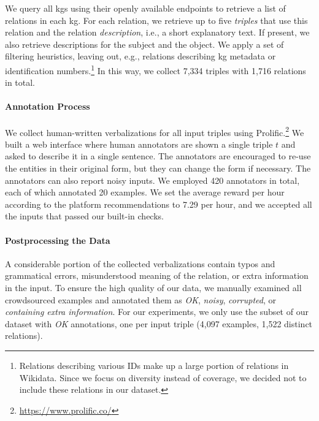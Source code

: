 We query all \acp{kg} using their openly available endpoints to retrieve a list of relations in each \ac{kg}. For each relation, we retrieve up to five \textit{triples} that use this relation and the relation \textit{description}, i.e., a short explanatory text.
If present, we also retrieve descriptions for the subject and the object. We apply a set of filtering heuristics, leaving out, e.g., relations describing \ac{kg} metadata or identification numbers.\footnote{Relations describing various IDs make up a large portion of relations in Wikidata. Since we focus on diversity instead of coverage, we decided not to include these relations in our dataset.} In this way, we collect 7,334 triples with 1,716 relations in total.

\paragraph{Annotation Process}
We collect human-written verbalizations for all input triples using Prolific.\footnote{\url{https://www.prolific.co/}} We built a web interface where human annotators are shown a single triple $t$ and asked to describe it in a single sentence. The annotators are encouraged to re-use the entities in their original form, but they can change the form if necessary. The annotators can also report noisy inputs. We employed 420 annotators in total, each of which annotated 20 examples. We set the average reward per hour according to the platform recommendations to  \textsterling{}7.29 per hour, and we accepted all the inputs that passed our built-in checks.

\paragraph{Postprocessing the Data}
A considerable portion of the collected verbalizations contain typos and grammatical errors, misunderstood meaning of the relation, or extra information in the input. To ensure the high quality of our data, we manually examined all crowdsourced examples and annotated them as \textit{OK}, \textit{noisy}, \textit{corrupted}, or \textit{containing extra information}. For our experiments, we only use the subset of our dataset with \textit{OK} annotations, one per input triple (4,097 examples, 1,522 distinct relations).


